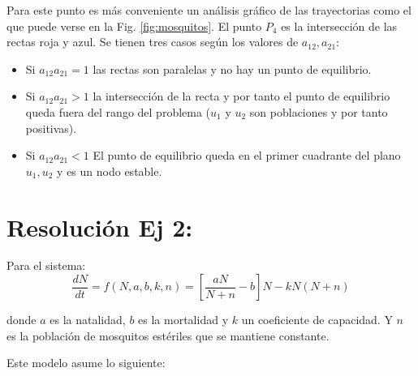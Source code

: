 \documentclass[twocolumn,aps,prl]{revtex4-1}
\begin{document}

Para este punto es más conveniente un análisis gráfico de las trayectorias como el que puede verse en la Fig. \ref{fig:mosquitos}. El punto $P_4$ es la intersección de las rectas roja y azul. Se tienen tres casos según los valores de $a_{12}, a_{21}$:
\begin{itemize}
    \item Si $a_{12} a_{21} = 1$ las rectas son paralelas y no hay un punto de equilibrio. 
    \item Si $a_{12} a_{21} > 1$ la intersección de la recta y por tanto el punto de equilibrio queda fuera del rango del problema ($u_1$ y $u_2$ son poblaciones y por tanto positivas). 
    \item Si $a_{12} a_{21} < 1$ El punto de equilibrio queda en el primer cuadrante del plano $u_1, u_2$ y es un nodo estable.
\end{itemize}


% 

\section{Resolución Ej 2:}

Para el sistema:
\begin{equation}\label{eq:esteril1}
    \frac{d N}{d t} = f(N,a,b,k,n) 
    = \left[\frac{a N}{N+n}-b\right] N- k N(N+n)
\end{equation}

donde $a$ es la natalidad, $b$ es la mortalidad y $k$ un coeficiente de capacidad. Y $n$ es la población de mosquitos estériles que se mantiene constante.

Este modelo asume lo siguiente:
\end{document}
